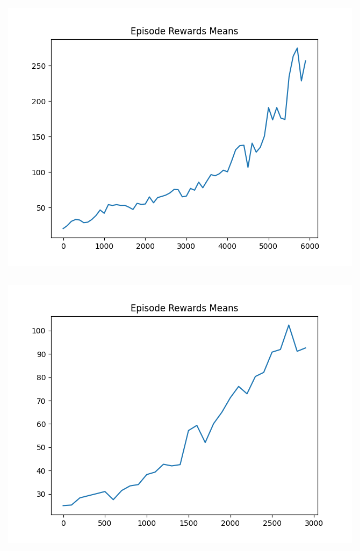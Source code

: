 \begin{figure}[H]
\begin{subfigure}{.47\linewidth}
        \includegraphics[width=\textwidth]{pole/2024-06-14_18-05-51_dqn_cartpole_episode_rewards_means.png}
    \end{subfigure}
    \begin{subfigure}{.47\linewidth}
        \centering
        \includegraphics[width=\textwidth]{pole/2024-06-13_19-11-27_dqn_cartpole_episode_rewards_means.png}
    \end{subfigure}
\end{figure}
